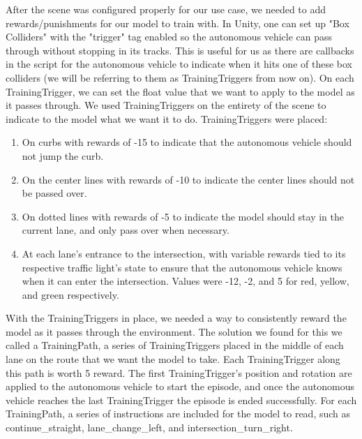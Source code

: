 \documentclass[conference]{IEEEtran}
\begin{document}
After the scene was configured properly for our use case, we needed to add rewards/punishments for our model to train with. In Unity, one can set up "Box Colliders" with the "trigger" tag enabled so the autonomous vehicle can pass through without stopping in its tracks. This is useful for us as there are callbacks in the script for the autonomous vehicle to indicate when it hits one of these box colliders (we will be referring to them as TrainingTriggers from now on). On each TrainingTrigger, we can set the float value that we want to apply to the model as it passes through. We used TrainingTriggers on the entirety of the scene to indicate to the model what we want it to do. TrainingTriggers were placed:
\begin{enumerate}
    \item On curbs with rewards of -15 to indicate that the autonomous vehicle should not jump the curb.
    \item On the center lines with rewards of -10 to indicate the center lines should not be passed over.
    \item On dotted lines with rewards of -5 to indicate the model should stay in the current lane, and only pass over when necessary.
    \item At each lane's entrance to the intersection, with variable rewards tied to its respective traffic light's state to ensure that the autonomous vehicle knows when it can enter the intersection. Values were -12, -2, and 5 for red, yellow, and green respectively.
\end{enumerate}\par
With the TrainingTriggers in place, we needed a way to consistently reward the model as it passes through the environment. The solution we found for this we called a TrainingPath, a series of TrainingTriggers placed in the middle of each lane on the route that we want the model to take. Each TrainingTrigger along this path is worth 5 reward. The first TrainingTrigger's position and rotation are applied to the autonomous vehicle to start the episode, and once the autonomous vehicle reaches the last TrainingTrigger the episode is ended successfully. For each TrainingPath, a series of instructions are included for the model to read, such as continue\_straight, lane\_change\_left, and intersection\_turn\_right.
\end{document}
